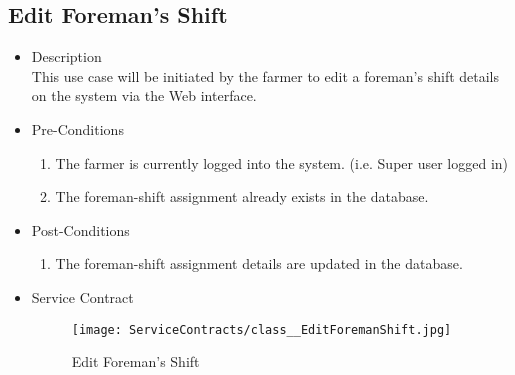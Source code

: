 \documentclass[11pt,fleqn]{book} %
\begin{document}
\subsection{Edit Foreman’s Shift}
\begin{itemize}
	\item Description\\
	This use case will be initiated by the farmer to edit a foreman’s shift details on the system via the Web interface.
	\item Pre-Conditions
	\begin{enumerate}
		\item The farmer is currently logged into the system. (i.e. Super user logged in)
		\item The foreman-shift assignment already exists in the database.	
	\end{enumerate}
	\item Post-Conditions
	\begin{enumerate}
		\item The foreman-shift assignment details are updated in the database.
	\end{enumerate}
	\item Service Contract
	\begin{figure}
		\texttt{[image: ServiceContracts/class\_\_EditForemanShift.jpg]}
		\caption{Edit Foreman’s Shift}
	\end{figure}
\end{itemize}
\end{document}
